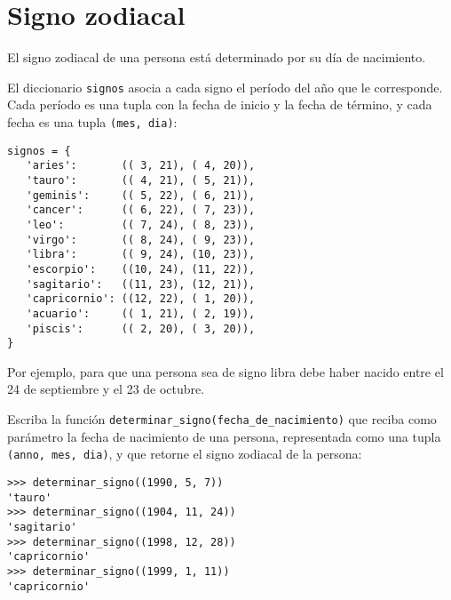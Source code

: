 \section{Signo zodiacal}

El signo zodiacal de una persona está determinado por su día de
nacimiento.

El diccionario \lstinline!signos! asocia a cada signo el período del año
que le corresponde. Cada período es una tupla con la fecha de inicio y
la fecha de término, y cada fecha es una tupla \lstinline!(mes, dia)!:

\begin{lstlisting}
signos = {
   'aries':       (( 3, 21), ( 4, 20)),
   'tauro':       (( 4, 21), ( 5, 21)),
   'geminis':     (( 5, 22), ( 6, 21)),
   'cancer':      (( 6, 22), ( 7, 23)),
   'leo':         (( 7, 24), ( 8, 23)),
   'virgo':       (( 8, 24), ( 9, 23)),
   'libra':       (( 9, 24), (10, 23)),
   'escorpio':    ((10, 24), (11, 22)),
   'sagitario':   ((11, 23), (12, 21)),
   'capricornio': ((12, 22), ( 1, 20)),
   'acuario':     (( 1, 21), ( 2, 19)),
   'piscis':      (( 2, 20), ( 3, 20)),
}
\end{lstlisting}

Por ejemplo, para que una persona sea de signo libra debe haber nacido
entre el 24 de septiembre y el 23 de octubre.

Escriba la función \lstinline!determinar_signo(fecha_de_nacimiento)! que
reciba como parámetro la fecha de nacimiento de una persona,
representada como una tupla \lstinline!(anno, mes, dia)!, y que retorne
el signo zodiacal de la persona:

\begin{lstlisting}
>>> determinar_signo((1990, 5, 7))
'tauro'
>>> determinar_signo((1904, 11, 24))
'sagitario'
>>> determinar_signo((1998, 12, 28))
'capricornio'
>>> determinar_signo((1999, 1, 11))
'capricornio'
\end{lstlisting}

